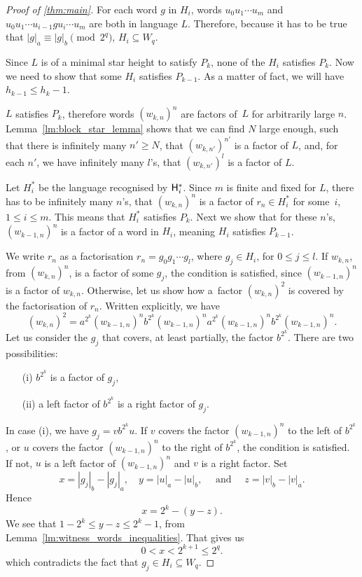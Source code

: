 \begin{proof}[Proof of \autoref*{thm:main}]
    For each word $g$ in $H_i$, words $u_0 u_1 \dotsm u_m$ and $u_0 u_1 \dotsm u_{i-1} g u_i \dotsm u_m$ are both in language $L$. Therefore, because it has to be true that $|g|_a \equiv |g|_b \pmod{2^q}$, $H_i \subseteq W_q$.

    Since $L$ is of a minimal star height to satisfy $P_k$, none of the $H_i$ satisfies $P_k$. Now we need to show that some $H_i$ satisfies $P_{k-1}$. As a matter of fact, we will have $h_{k-1} \leq h_k - 1$.

    $L$ satisfies $P_k$, therefore words ${(w_{k,n})}^n$ are factors of~$L$ for arbitrarily large $n$. Lemma~\ref*{lm:block_star_lemma} shows that we can find $N$ large enough, such that there is infinitely many $n' \geq N$, that ${(w_{k,n'})}^{n'}$ is a factor of $L$, and, for each $n'$, we have infinitely many $l$'s, that ${(w_{k,n'})}^l$ is a factor of $L$.

    Let $H_i^*$ be the language recognised by ${\mathsf{H}}_i^*$. Since $m$ is finite and fixed for $L$, there has to be infinitely many $n$'s, that ${(w_{k,n})}^n$ is a factor of $r_n \in H_i^*$ for some~$i$, $1 \leq i \leq m$. This means that $H_i^*$ satisfies $P_k$. Next we show that for these $n$'s, ${(w_{k-1,n})}^n$ is a factor of a word in $H_i$, meaning $H_i$ satisfies $P_{k-1}$.

    We write $r_n$ as a factorisation $r_n = g_0 g_1 \dotsm g_l$, where $g_j \in H_i$, for $0 \leq j \leq l$. If $w_{k,n}$, from ${(w_{k,n})}^n$, is a factor of some $g_j$, the condition is satisfied, since ${(w_{k-1,n})}^n$ is a factor of $w_{k,n}$. Otherwise, let us show how a~factor ${(w_{k,n})}^2$ is covered by the factorisation of $r_n$. Written explicitly, we have
    \[
        {(w_{k,n})}^2 = a^{2^k}{(w_{k-1,n})}^{n}b^{2^k}{(w_{k-1,n})}^{n}a^{2^k}{(w_{k-1,n})}^{n}b^{2^k}{(w_{k-1,n})}^{n}.
    \]
    Let us consider the $g_j$ that covers, at least partially, the factor $b^{2^k}$. There are two possibilities:
    \begin{itemize}
        \item[(i)] $b^{2^k}$ is a factor of $g_j$,
        \item[(ii)] a left factor of $b^{2^k}$ is a right factor of $g_j$.
    \end{itemize}

    In case (i), we have $g_j = v b^{2^k} u$. If $v$ covers the factor ${(w_{k-1,n})}^{n}$ to the left of $b^{2^k}$, or $u$ covers the factor ${(w_{k-1,n})}^{n}$ to the right of $b^{2^k}$, the condition is satisfied. If not, $u$ is a left factor of ${(w_{k-1,n})}^{n}$ and $v$ is a right factor. Set
    \[
        x = |g_j|_b - |g_j|_a, \quad y = |u|_a - |u|_b, \quad \text{ and } \quad z = |v|_b - |v|_a.
    \]
    Hence
    \[
        x = 2^k - (y - z).
    \]
    We see that $1 - 2^k \leq y - z \leq 2^k - 1$, from Lemma~\ref*{lm:witness_words_inequalities}. That gives us
    \[
        0 < x < 2^{k+1} \leq 2^q.
    \]
    which contradicts the fact that $g_j \in H_i \subseteq W_q$.


\end{proof}
